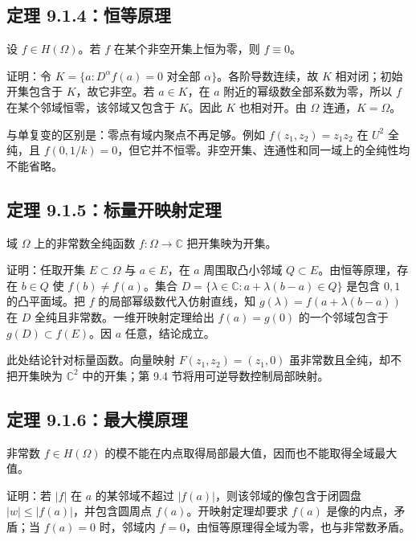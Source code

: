 \documentclass[11pt,a4paper]{article}
\begin{document}
\subsection{定理 9.1.4：恒等原理}\label{ch09-s1-heading-6}

设 \(f\in H(\Omega)\)。若 \(f\) 在某个非空开集上恒为零，则
\(f\equiv0\)。

证明：令
\(K=\{a:D^\alpha f(a)=0\text{ 对全部 }\alpha\}\)。各阶导数连续，故 \(K\)
相对闭；初始开集包含于 \(K\)，故它非空。若 \(a\in K\)，在 \(a\)
附近的幂级数全部系数为零，所以 \(f\) 在某个邻域恒零，该邻域又包含于
\(K\)。因此 \(K\) 也相对开。由 \(\Omega\) 连通，\(K=\Omega\)。

与单复变的区别是：零点有域内聚点不再足够。例如 \(f(z_1,z_2)=z_1z_2\) 在
\(U^2\) 全纯，且
\(f(0,1/k)=0\)，但它并不恒零。非空开集、连通性和同一域上的全纯性均不能省略。

\subsection{定理 9.1.5：标量开映射定理}\label{ch09-s1-heading-7}

域 \(\Omega\) 上的非常数全纯函数 \(f:\Omega\to\mathbb C\)
把开集映为开集。

证明：任取开集 \(E\subset\Omega\) 与 \(a\in E\)，在 \(a\) 周围取凸小邻域
\(Q\subset E\)。由恒等原理，存在 \(b\in Q\) 使 \(f(b)\ne f(a)\)。集合
\(D=\{\lambda\in\mathbb C:a+\lambda(b-a)\in Q\}\) 是包含 \(0,1\)
的凸平面域。把 \(f\) 的局部幂级数代入仿射直线，知
\(g(\lambda)=f(a+\lambda(b-a))\) 在 \(D\)
全纯且非常数。一维开映射定理给出 \(f(a)=g(0)\) 的一个邻域包含于
\(g(D)\subset f(E)\)。因 \(a\) 任意，结论成立。

此处结论针对标量函数。向量映射 \(F(z_1,z_2)=(z_1,0)\)
虽非常数且全纯，却不把开集映为 \(\mathbb C^2\) 中的开集；第 9.4
节将用可逆导数控制局部映射。

\subsection{定理 9.1.6：最大模原理}\label{ch09-s1-heading-8}

非常数 \(f\in H(\Omega)\)
的模不能在内点取得局部最大值，因而也不能取得全域最大值。

证明：若 \(|f|\) 在 \(a\) 的某邻域不超过
\(|f(a)|\)，则该邻域的像包含于闭圆盘 \(|w|\le|f(a)|\)，并包含圆周点
\(f(a)\)。开映射定理却要求 \(f(a)\) 是像的内点，矛盾；当 \(f(a)=0\)
时，邻域内 \(f=0\)，由恒等原理得全域为零，也与非常数矛盾。
\end{document}
